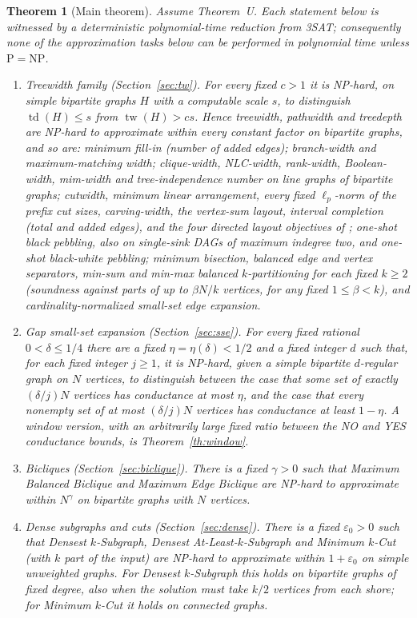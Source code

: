 \documentclass[11pt,letterpaper]{article}
\newtheorem{theorem}{Theorem}[section]
\theoremstyle{definition}
\theoremstyle{remark}
\newcommand{\eps}{\varepsilon}
\DeclareMathOperator{\tw}{tw}
\DeclareMathOperator{\td}{td}
\begin{document}
\begin{theorem}[Main theorem]\label{th:main}
Assume Theorem~U. Each statement below is witnessed by a deterministic
polynomial-time reduction from 3SAT; consequently none of the approximation
tasks below can be performed in polynomial time unless
\(\mathrm P=\mathrm{NP}\).
\begin{enumerate}[label=\textup{(\Alph*)}]
\item \emph{Treewidth family} (Section~\ref{sec:tw}). For every fixed
\(c>1\) it is NP-hard, on simple bipartite graphs \(H\) with a computable
scale \(s\), to distinguish \(\td(H)\le s\) from \(\tw(H)>cs\). Hence
treewidth, pathwidth and treedepth are NP-hard to approximate within every
constant factor on bipartite graphs, and so are:
minimum fill-in (number of added edges);
branch-width and maximum-matching width;
clique-width, NLC-width, rank-width, Boolean-width, mim-width and
tree-independence number on line graphs of bipartite graphs;
cutwidth, minimum linear arrangement, every fixed \(\ell_p\)-norm of the
prefix cut sizes, carving-width, the vertex-sum layout, interval completion
(total and added edges), and the four directed layout objectives of
\cite{wapl14};
one-shot black pebbling, also on single-sink DAGs of maximum indegree two,
and one-shot black-white pebbling;
minimum bisection, balanced edge and vertex separators, min-sum and min-max
balanced \(k\)-partitioning for each fixed \(k\ge2\) (soundness against
parts of up to \(\beta N/k\) vertices, for any fixed \(1\le\beta<k\)), and
cardinality-normalized small-set edge expansion.
\item \emph{Gap small-set expansion} (Section~\ref{sec:sse}). For every fixed
rational \(0<\delta\le1/4\) there are a fixed \(\eta=\eta(\delta)<1/2\) and a
fixed integer \(d\) such that, for each fixed integer \(j\ge1\), it is
NP-hard, given a simple bipartite \(d\)-regular graph on \(N\) vertices, to
distinguish between the case that some set of exactly \((\delta/j)N\)
vertices has conductance at most \(\eta\), and the case that every nonempty
set of at most \((\delta/j)N\) vertices has conductance at least \(1-\eta\).
A window version, with an arbitrarily large fixed ratio between the NO and
YES conductance bounds, is Theorem~\ref{th:window}.
\item \emph{Bicliques} (Section~\ref{sec:biclique}). There is a fixed
\(\gamma>0\) such that Maximum Balanced Biclique and Maximum Edge Biclique
are NP-hard to approximate within \(N^\gamma\) on bipartite graphs with
\(N\) vertices.
\item \emph{Dense subgraphs and cuts} (Section~\ref{sec:dense}). There is a
fixed \(\eps_0>0\) such that Densest \(k\)-Subgraph, Densest
At-Least-\(k\)-Subgraph and Minimum \(k\)-Cut (with \(k\) part of the input)
are NP-hard to approximate within \(1+\eps_0\) on simple unweighted graphs.
For Densest \(k\)-Subgraph this holds on bipartite graphs of fixed degree,
also when the solution must take \(k/2\) vertices from each shore; for
Minimum \(k\)-Cut it holds on connected graphs.
\end{enumerate}
\end{theorem}
\end{document}
